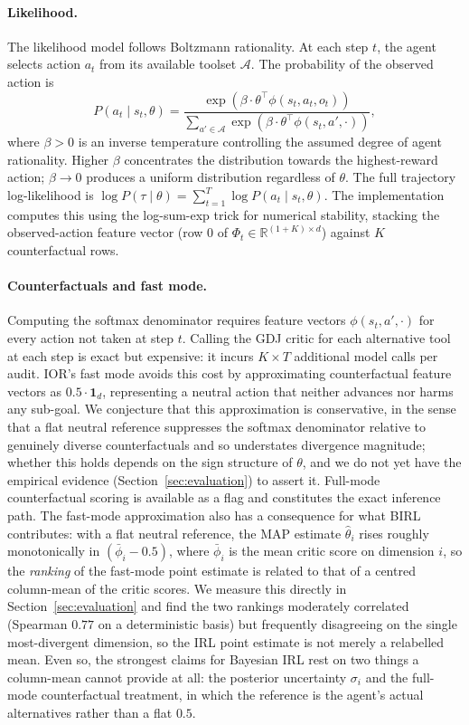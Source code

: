 \paragraph{Likelihood.}
The likelihood model follows Boltzmann rationality. At each step $t$, the agent
selects action $a_t$ from its available toolset $\mathcal{A}$. The probability of
the observed action is
\begin{equation}
P(a_t \mid s_t, \theta) =
\frac{\exp\!\left(\beta \cdot \theta^\top \phi(s_t, a_t, o_t)\right)}
{\sum_{a' \in \mathcal{A}} \exp\!\left(\beta \cdot \theta^\top \phi(s_t, a', \cdot)\right)},
\end{equation}
where $\beta > 0$ is an inverse temperature controlling the assumed degree of
agent rationality. Higher $\beta$ concentrates the distribution towards the
highest-reward action; $\beta \to 0$ produces a uniform distribution regardless of
$\theta$. The full trajectory log-likelihood is
$\log P(\tau \mid \theta) = \sum_{t=1}^{T} \log P(a_t \mid s_t, \theta)$. The
implementation computes this using the log-sum-exp trick for numerical stability,
stacking the observed-action feature vector (row $0$ of
$\Phi_t \in \mathbb{R}^{(1+K) \times d}$) against $K$ counterfactual rows.

\paragraph{Counterfactuals and fast mode.}
Computing the softmax denominator requires feature vectors
$\phi(s_t, a', \cdot)$ for every action not taken at step $t$. Calling the GDJ
critic for each alternative tool at each step is exact but expensive: it incurs
$K \times T$ additional model calls per audit. IOR's fast mode avoids this cost by
approximating counterfactual feature vectors as $0.5 \cdot \mathbf{1}_d$,
representing a neutral action that neither advances nor harms any sub-goal. We
conjecture that this approximation is conservative, in the sense that a flat
neutral reference suppresses the softmax denominator relative to genuinely diverse
counterfactuals and so understates divergence magnitude; whether this holds depends
on the sign structure of $\theta$, and we do not yet have the empirical evidence
(Section~\ref{sec:evaluation}) to assert it. Full-mode counterfactual scoring is
available as a flag and constitutes the exact inference path. The fast-mode
approximation also has a consequence for what BIRL contributes: with a flat neutral
reference, the MAP estimate $\hat{\theta}_i$ rises roughly monotonically in
$(\bar{\phi}_i - 0.5)$, where $\bar{\phi}_i$ is the mean critic score on dimension
$i$, so the \emph{ranking} of the fast-mode point estimate is related to that of a
centred column-mean of the critic scores. We measure this directly in
Section~\ref{sec:evaluation} and find the two rankings moderately correlated
(Spearman $0.77$ on a deterministic basis) but frequently disagreeing on the single
most-divergent dimension, so the IRL point estimate is not merely a relabelled mean.
Even so, the strongest claims for Bayesian IRL rest on two things a column-mean
cannot provide at all: the posterior uncertainty $\sigma_i$ and the full-mode
counterfactual treatment, in which the reference is the agent's actual alternatives
rather than a flat $0.5$.

